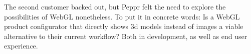 The second customer backed out, but Peppr felt the need to explore the possibilities of WebGL nonetheless. To put it in concrete words: Is a WebGL product configurator that directly shows 3d models instead of images a viable alternative to their current workflow? Both in development, as well as end user experience.





